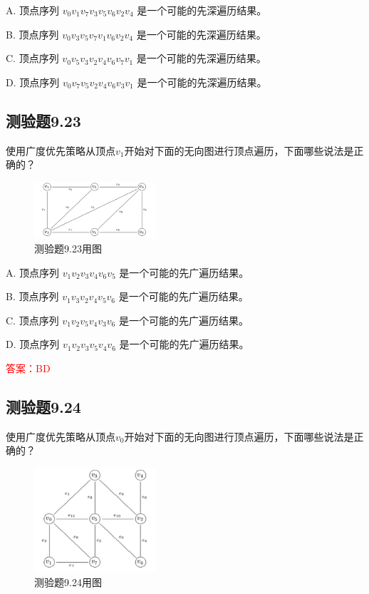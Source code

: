 \documentclass[UTF8, heading=true]{ctexart}
\begin{document}
A. 顶点序列 $v_0 v_1 v_7 v_3 v_5 v_6 v_2 v_4$ 是一个可能的先深遍历结果。

B. 顶点序列 $v_0 v_3 v_5 v_7 v_1 v_6 v_2 v_4$ 是一个可能的先深遍历结果。

C. 顶点序列 $v_0 v_5 v_3 v_2 v_4 v_6 v_7 v_1$ 是一个可能的先深遍历结果。

D. 顶点序列 $v_0 v_7 v_5 v_2 v_4 v_6 v_3 v_1$ 是一个可能的先深遍历结果。

\subsection{测验题9.23}

使用广度优先策略从顶点$v_1$开始对下面的无向图进行顶点遍历，下面哪些说法是正确的？

\begin{figure}[H]
  \centering
  \includegraphics[width=0.4\textwidth]{9.23.jpg} %
  \caption{测验题9.23用图}
\end{figure}


A. 顶点序列 $v_1 v_2 v_3 v_4 v_6 v_5$ 是一个可能的先广遍历结果。

B. 顶点序列 $v_1 v_3 v_2 v_4 v_5 v_6$ 是一个可能的先广遍历结果。

C. 顶点序列 $v_1 v_2 v_5 v_4 v_3 v_6$ 是一个可能的先广遍历结果。

D. 顶点序列 $v_1 v_2 v_3 v_5 v_4 v_6$ 是一个可能的先广遍历结果。

\textcolor{red}{答案：BD}

\subsection{测验题9.24}

使用广度优先策略从顶点$v_0$开始对下面的无向图进行顶点遍历，下面哪些说法是正确的？

\begin{figure}[H]
  \centering
  \includegraphics[width=0.4\textwidth]{9.24.jpg} %
  \caption{测验题9.24用图}
\end{figure}
\end{document}
